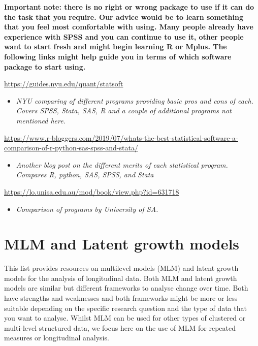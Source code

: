 \documentclass[
]{book}
\providecommand{\tightlist}{%
  \setlength{\itemsep}{0pt}\setlength{\parskip}{0pt}}
\begin{document}
\textbf{Important note: there is no right or wrong package to use if it can do the task that you require. Our advice would be to learn something that you feel most comfortable with using. Many people already have experience with SPSS and you can continue to use it, other people want to start fresh and might begin learning R or Mplus. The following links might help guide you in terms of which software package to start using. }

\url{https://guides.nyu.edu/quant/statsoft}

\begin{itemize}
\tightlist
\item
  \emph{NYU comparing of different programs providing basic pros and cons of each. Covers SPSS, Stata, SAS, R and a couple of additional programs not mentioned here.}
\end{itemize}

\url{https://www.r-bloggers.com/2019/07/whats-the-best-statistical-software-a-comparison-of-r-python-sas-spss-and-stata/}

\begin{itemize}
\tightlist
\item
  \emph{Another blog post on the different merits of each statistical program. Compares R, python, SAS, SPSS, and Stata}
\end{itemize}

\url{https://lo.unisa.edu.au/mod/book/view.php?id=631718}

\begin{itemize}
\tightlist
\item
  \emph{Comparison of programs by University of SA.}
\end{itemize}

\hypertarget{mlm-and-latent-growth-models}{%
\chapter{MLM and Latent growth models}\label{mlm-and-latent-growth-models}}

This list provides resources on multilevel models (MLM) and latent growth models for the analysis of longitudinal data. Both MLM and latent growth models are similar but different frameworks to analyse change over time. Both have strengths and weaknesses and both frameworks might be more or less suitable depending on the specific research question and the type of data that you want to analyse. Whilst MLM can be used for other types of clustered or multi-level structured data, we focus here on the use of MLM for repeated measures or longitudinal analysis.
\end{document}
